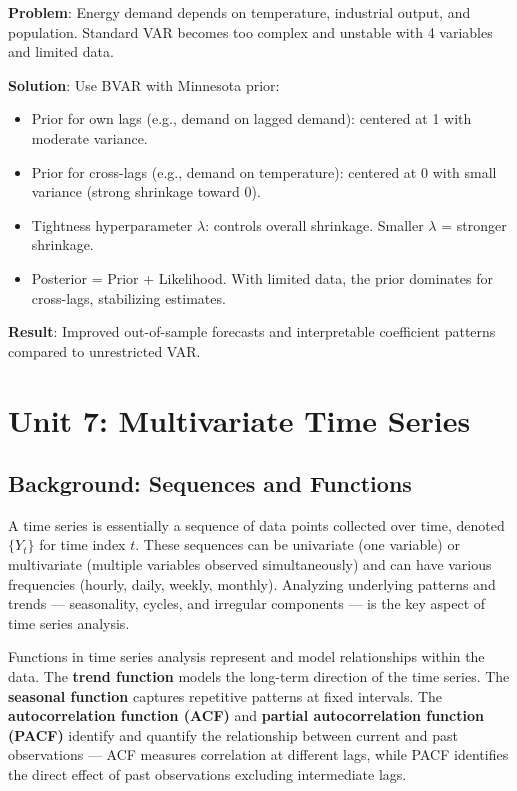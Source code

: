 \documentclass[11pt,a4paper]{article}
\begin{document}
\begin{tcolorbox}[colback=green!5!white,colframe=green!75!black,title=\textbf{Worked Example 17: BVAR for Energy Demand}]
\textbf{Problem}: Energy demand depends on temperature, industrial output, and population. Standard VAR becomes too complex and unstable with 4 variables and limited data.

\textbf{Solution}: Use BVAR with Minnesota prior:
\begin{itemize}
    \item Prior for own lags (e.g., demand on lagged demand): centered at 1 with moderate variance.
    \item Prior for cross-lags (e.g., demand on temperature): centered at 0 with small variance (strong shrinkage toward 0).
    \item Tightness hyperparameter $\lambda$: controls overall shrinkage. Smaller $\lambda$ = stronger shrinkage.
    \item Posterior = Prior + Likelihood. With limited data, the prior dominates for cross-lags, stabilizing estimates.
\end{itemize}
\textbf{Result}: Improved out-of-sample forecasts and interpretable coefficient patterns compared to unrestricted VAR.
\end{tcolorbox}


\section{Unit 7: Multivariate Time Series}

\subsection{Background: Sequences and Functions}

A time series is essentially a sequence of data points collected over time, denoted $\{Y_t\}$ for time index $t$. These sequences can be univariate (one variable) or multivariate (multiple variables observed simultaneously) and can have various frequencies (hourly, daily, weekly, monthly). Analyzing underlying patterns and trends --- seasonality, cycles, and irregular components --- is the key aspect of time series analysis.

Functions in time series analysis represent and model relationships within the data. The \textbf{trend function} models the long-term direction of the time series. The \textbf{seasonal function} captures repetitive patterns at fixed intervals. The \textbf{autocorrelation function (ACF)} and \textbf{partial autocorrelation function (PACF)} identify and quantify the relationship between current and past observations --- ACF measures correlation at different lags, while PACF identifies the direct effect of past observations excluding intermediate lags.
\end{document}
